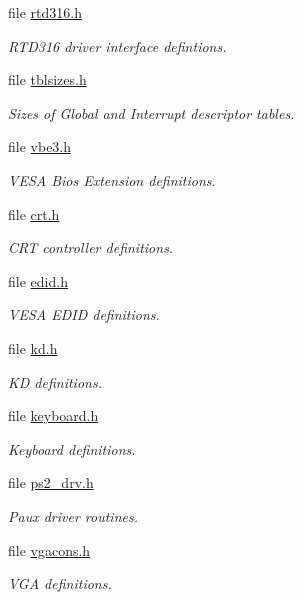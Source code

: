 \begin{DoxyCompactItemize}
file \mbox{\hyperlink{rtd316_8h}{rtd316.\+h}}
\begin{DoxyCompactList}\small\item\em R\+T\+D316 driver interface defintions. \end{DoxyCompactList}\item 
file \mbox{\hyperlink{tblsizes_8h}{tblsizes.\+h}}
\begin{DoxyCompactList}\small\item\em Sizes of Global and Interrupt descriptor tables. \end{DoxyCompactList}\item 
file \mbox{\hyperlink{vbe3_8h}{vbe3.\+h}}
\begin{DoxyCompactList}\small\item\em V\+E\+SA Bios Extension definitions. \end{DoxyCompactList}\item 
file \mbox{\hyperlink{crt_8h}{crt.\+h}}
\begin{DoxyCompactList}\small\item\em C\+RT controller definitions. \end{DoxyCompactList}\item 
file \mbox{\hyperlink{edid_8h}{edid.\+h}}
\begin{DoxyCompactList}\small\item\em V\+E\+SA E\+D\+ID definitions. \end{DoxyCompactList}\item 
file \mbox{\hyperlink{kd_8h}{kd.\+h}}
\begin{DoxyCompactList}\small\item\em KD definitions. \end{DoxyCompactList}\item 
file \mbox{\hyperlink{i386_2pc386_2include_2rtems_2keyboard_8h}{keyboard.\+h}}
\begin{DoxyCompactList}\small\item\em Keyboard definitions. \end{DoxyCompactList}\item 
file \mbox{\hyperlink{ps2__drv_8h}{ps2\+\_\+drv.\+h}}
\begin{DoxyCompactList}\small\item\em Paux driver routines. \end{DoxyCompactList}\item 
file \mbox{\hyperlink{vgacons_8h}{vgacons.\+h}}
\begin{DoxyCompactList}\small\item\em V\+GA definitions. \end{DoxyCompactList}\item 

\end{DoxyCompactItemize}
